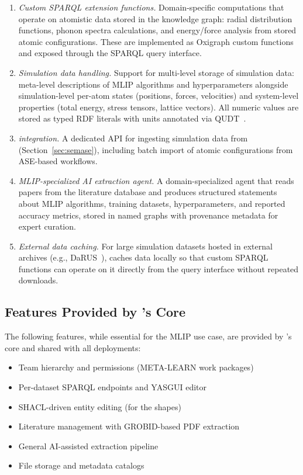 \begin{enumerate}
\item \emph{Custom SPARQL extension functions.} Domain-specific computations
  that operate on atomistic data stored in the knowledge graph: radial
  distribution functions, phonon spectra calculations, and energy/force
  analysis from stored atomic configurations. These are implemented as
  Oxigraph custom functions and exposed through the SPARQL query interface.

\item \emph{Simulation data handling.} Support for multi-level storage of
  simulation data: meta-level descriptions of MLIP algorithms and
  hyperparameters alongside simulation-level per-atom states (positions,
  forces, velocities) and system-level properties (total energy, stress
  tensors, lattice vectors). All numeric values are stored as typed RDF
  literals with units annotated via QUDT~\cite{hodgson2014qudt}.

\item \emph{\SemASE{} integration.} A dedicated API for ingesting
  simulation data from \SemASE{} (Section~\ref{sec:semase}), including
  batch import of atomic configurations from ASE-based workflows.

\item \emph{MLIP-specialized AI extraction agent.} A domain-specialized
  agent that reads papers from the literature database and produces structured
  statements about MLIP algorithms, training datasets, hyperparameters, and
  reported accuracy metrics, stored in named graphs with provenance metadata
  for expert curation.

\item \emph{External data caching.} For large simulation datasets hosted in
  external archives (e.g., DaRUS~\cite{darus2024}), \MLIPE{} caches data
  locally so that custom SPARQL functions can operate on it directly from
  the query interface without repeated downloads.
\end{enumerate}

\subsection{Features Provided by \Concon{}'s Core}

The following features, while essential for the MLIP use case, are provided
by \Concon{}'s core and shared with all deployments:

\begin{itemize}
\item Team hierarchy and permissions (META-LEARN work packages)
\item Per-dataset SPARQL endpoints and YASGUI editor
\item SHACL-driven entity editing (for the \MLIPsOntology{} shapes)
\item Literature management with GROBID-based PDF extraction
\item General AI-assisted extraction pipeline
\item File storage and metadata catalogs
\end{itemize}

